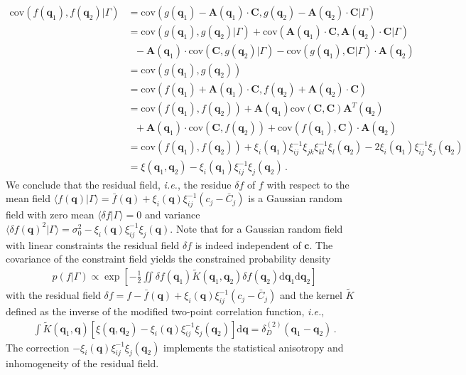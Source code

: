 \documentclass[a4paper, 11pt]{article}
\begin{document}
\begin{align}
\text{cov}(f(\bm{q}_1), f(\bm{q}_2)|\Gamma) 
&= \text{cov}(g(\bm{q}_1) - \bm{A}(\bm{q}_1)\cdot \bm{C}, g(\bm{q}_2) - \bm{A}(\bm{q}_2)\cdot \bm{C}|\Gamma) \nonumber\\
&= \text{cov}(g(\bm{q}_1), g(\bm{q}_2)|\Gamma) + \text{cov}(\bm{A}(\bm{q}_1)\cdot \bm{C}, \bm{A}(\bm{q}_2)\cdot \bm{C}|\Gamma)\nonumber\\
&\ \ \  - \bm{A}(\bm{q}_1)\cdot \text{cov}(\bm{C}, g(\bm{q}_2)|\Gamma) -\text{cov}(g(\bm{q}_1) , \bm{C}|\Gamma)\cdot \bm{A}(\bm{q}_2)\nonumber\\
&= \text{cov}(g(\bm{q}_1), g(\bm{q}_2)) \nonumber\\
&=\text{cov}(f(\bm{q}_1) + \bm{A}(\bm{q}_1)\cdot \bm{C}, f(\bm{q}_2) + \bm{A}(\bm{q}_2)\cdot \bm{C})\nonumber\\
&=\text{cov}(f(\bm{q}_1), f(\bm{q}_2)) + \bm{A}(\bm{q}_1) \text{cov}(\bm{C},\bm{C}) \bm{A}^T(\bm{q}_2) \nonumber\\
&\ \ \ + \bm{A}(\bm{q}_1) \cdot \text{cov}(\bm{C},f(\bm{q}_2))+ \text{cov}(f(\bm{q}_1), \bm{C}) \cdot \bm{A}(\bm{q}_2) \nonumber\\
&=\text{cov}(f(\bm{q}_1), f(\bm{q}_2)) + \xi_i(\bm{q}_1)\xi_{ij}^{-1}\xi_{jk}\xi_{kl}^{-1}\xi_{l}(\bm{q}_2) - 2\xi_i(\bm{q}_1)\xi_{ij}^{-1}\xi_{j}(\bm{q}_2)\nonumber\\
&=\xi(\bm{q}_1,\bm{q}_2) - \xi_i(\bm{q}_1) \xi_{ij}^{-1} \xi_j(\bm{q}_2)\,.
\end{align}
We conclude that the residual field, \textit{i.e.}, the residue $\delta f$ of $f$ with respect to the mean field $\langle f(\bm{q})|\Gamma\rangle =\bar{f}(\bm{q})+ \xi_i(\bm{q})\xi_{ij}^{-1}(c_j-\bar{C}_j)$ is a Gaussian random field with zero mean $\langle \delta f|\Gamma\rangle=0$ and variance $\langle \delta f(\bm{q})^2|\Gamma\rangle = \sigma_0^2 - \xi_i(\bm{q}) \xi_{ij}^{-1} \xi_j(\bm{q})$. Note that
for a Gaussian random field with linear constraints the residual field $\delta f$ is indeed independent of $\bm{c}$. The covariance of the constraint field yields the constrained probability density
\begin{align}
p(f|\Gamma) \propto  \exp\left[-\frac{1}{2} \iint \delta{f}(\bm{q}_1) \tilde{K}(\bm{q}_1,\bm{q}_2) \delta f(\bm{q}_2)\mathrm{d}\bm{q}_1 \mathrm{d}\bm{q}_2 \right]
\end{align}
with the residual field $\delta f = f-\bar{f}(\bm{q})+ \xi_i(\bm{q})\xi_{ij}^{-1}(c_j-\bar{C}_j)$ and the kernel $\tilde{K}$ defined as the inverse of the modified two-point correlation function, \textit{i.e.},
\begin{align}
\int \tilde{K}(\bm{q}_1,\bm{q}) \left[\xi(\bm{q},\bm{q}_2) - \xi_i(\bm{q})\xi_{ij}^{-1}\xi_j(\bm{q}_2)\right]\mathrm{d}\bm{q}= \delta_D^{(2)}(\bm{q}_1-\bm{q}_2)\,.
\end{align}
The correction $- \xi_i(\bm{q})\xi_{ij}^{-1}\xi_j(\bm{q}_2)$ implements the statistical anisotropy and inhomogeneity of the residual field.
\end{document}
